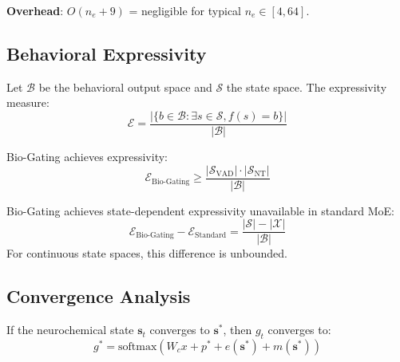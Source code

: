 \documentclass[preprint,12pt]{elsarticle}
\begin{document}
\textbf{Overhead}: $O(n_e + 9)$ = negligible for typical $n_e \in [4, 64]$.

\subsection{Behavioral Expressivity}

\begin{definition}
Let $\mathcal{B}$ be the behavioral output space and $\mathcal{S}$ the state space. The expressivity measure:
\begin{equation}
\mathcal{E} = \frac{|\{b \in \mathcal{B} : \exists s \in \mathcal{S}, f(s) = b\}|}{|\mathcal{B}|}
\end{equation}
\end{definition}

\begin{lemma}
Bio-Gating achieves expressivity:
\begin{equation}
\mathcal{E}_{\text{Bio-Gating}} \geq \frac{|\mathcal{S}_{\text{VAD}}| \cdot |\mathcal{S}_{\text{NT}}|}{|\mathcal{B}|}
\end{equation}
\end{lemma}

\begin{theorem}
Bio-Gating achieves state-dependent expressivity unavailable in standard MoE:
\begin{equation}
\mathcal{E}_{\text{Bio-Gating}} - \mathcal{E}_{\text{Standard}} = \frac{|\mathcal{S}| - |\mathcal{X}|}{|\mathcal{B}|}
\end{equation}
For continuous state spaces, this difference is unbounded.
\end{theorem}

\subsection{Convergence Analysis}

\begin{theorem}
If the neurochemical state $\mathbf{s}_t$ converges to $\mathbf{s}^*$, then $g_t$ converges to:
\begin{equation}
g^* = \text{softmax}(W_c x + p^* + e(\mathbf{s}^*) + m(\mathbf{s}^*))
\end{equation}
\end{theorem}
\end{document}
